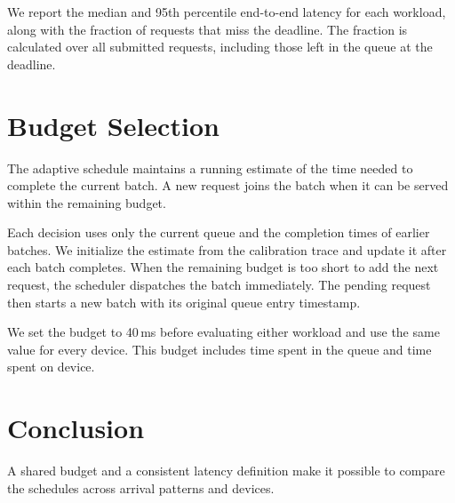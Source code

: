\documentclass[sigconf,nonacm]{acmart}
\begin{document}
We report the median and 95th percentile end-to-end latency for each workload,
along with the fraction of requests that miss the deadline. The fraction is
calculated over all submitted requests, including those left in the queue at
the deadline.

\newpage
\section{Budget Selection}
The adaptive schedule maintains a running estimate of the time needed to
complete the current batch. A new request joins the batch when it can be served
within the remaining budget.

Each decision uses only the current queue and the completion times of earlier
batches. We initialize the estimate from the calibration trace and update it
after each batch completes. When the remaining budget is too short to add the
next request, the scheduler dispatches the batch immediately. The pending
request then starts a new batch with its original queue entry timestamp.

\rpoint[E1]\rpoint[E2]We set the budget to 40\,ms before evaluating either
workload and use the same value for every device. This budget includes time
spent in the queue and time spent on device.

\section{Conclusion}
A shared budget and a consistent latency definition make it possible to
compare the schedules across arrival patterns and devices.
\end{document}
